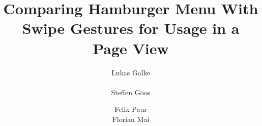 \documentclass{sig-alternate-05-2015}
\begin{document}
%
\title{Comparing Hamburger Menu With Swipe Gestures for Usage in a Page View}
%
%
%
%
%
\author{
  \alignauthor
  Lukas Galke\\
  \\
  \alignauthor Steffen Goos\\
  \and  %
  \alignauthor
  Felix Paur\\
  \alignauthor
  Florian Mai\\
}
\end{document}
